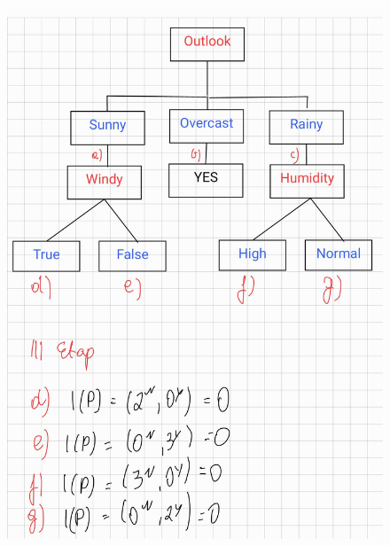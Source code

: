 \documentclass{article}
\begin{document}
\begin{figure}[H]
    \centering
    \includegraphics[width=\textwidth]{tree8.jpg}
\end{figure}
\end{document}
